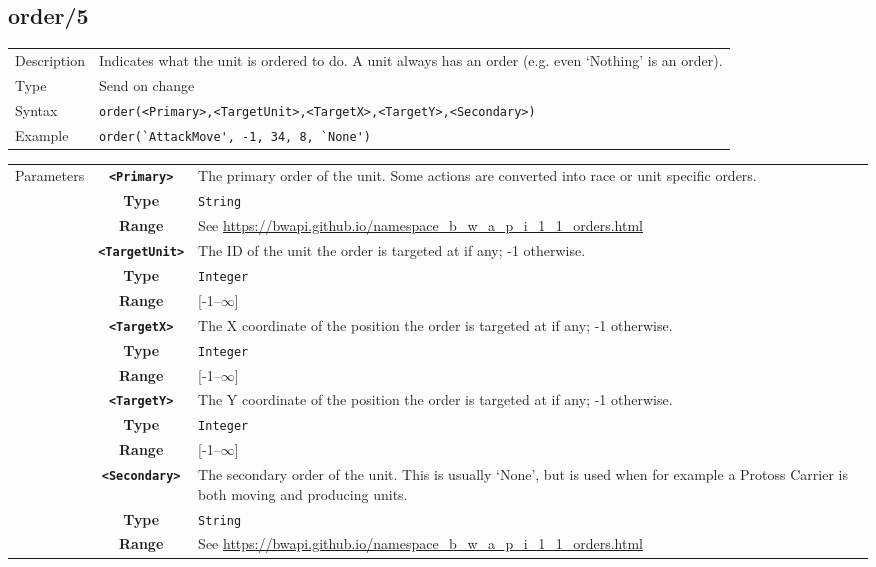 \subsection{order/5}
\begin{tabularx}{\textwidth}{lX}
 Description & Indicates what the unit is ordered to do. A unit always has an order (e.g. even `Nothing' is an order). \\
 Type & Send on change \\
 Syntax & \verb|order(<Primary>,<TargetUnit>,<TargetX>,<TargetY>,<Secondary>)| \\
 Example & \verb|order(`AttackMove', -1, 34, 8, `None')|   \\
 \end{tabularx}
 \begin{tabularx}{\textwidth}{l | c | p{8cm}|}
 \cline{2-3}
 Parameters & \textbf{\verb|<Primary>|} & The primary order of the unit. Some actions are converted into race or unit specific orders. \\
            & \textbf{Type} & \verb|String| \\
            &\textbf{Range} &  See \url{https://bwapi.github.io/namespace_b_w_a_p_i_1_1_orders.html} \\
            \cline{2-3}
            & \textbf{\verb|<TargetUnit>|} & The ID of the unit the order is targeted at if any; -1 otherwise. \\
            & \textbf{Type} & \verb|Integer| \\
            &\textbf{Range} &  [-1--$\infty$] \\
            \cline{2-3}
            & \textbf{\verb|<TargetX>|} & The X coordinate of the position the order is targeted at if any; -1 otherwise. \\
            & \textbf{Type} & \verb|Integer| \\
            &\textbf{Range} &  [-1--$\infty$] \\
            \cline{2-3}
            & \textbf{\verb|<TargetY>|} & The Y coordinate of the position the order is targeted at if any; -1 otherwise. \\
            & \textbf{Type} & \verb|Integer| \\
            &\textbf{Range} &  [-1--$\infty$] \\
            \cline{2-3}
            & \textbf{\verb|<Secondary>|} & The secondary order of the unit. This is usually `None', but is used when for example a Protoss Carrier is both moving and producing units.\\
            & \textbf{Type} & \verb|String| \\
            &\textbf{Range} &  See \url{https://bwapi.github.io/namespace_b_w_a_p_i_1_1_orders.html} \\
            \cline{2-3}
\end{tabularx}

